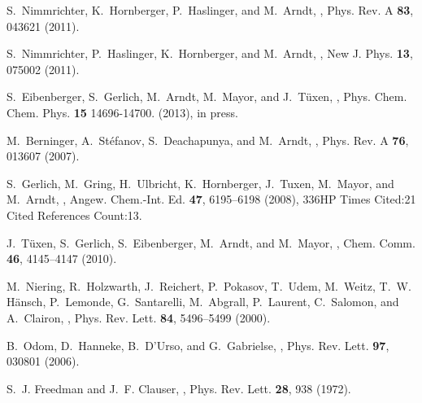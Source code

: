 \documentclass[11pt]{article}
\begin{document}
\begin{thebibliography}{100}
S.~Nimmrichter, K.~Hornberger, P.~Haslinger, and M.~Arndt,
,
\newblock Phys. Rev. A {\bf 83}, 043621 (2011).

S.~Nimmrichter, P.~Haslinger, K.~Hornberger, and M.~Arndt,
,
\newblock New J. Phys. {\bf 13}, 075002 (2011).

S.~Eibenberger, S.~Gerlich, M.~Arndt, M.~Mayor, and J.~Tüxen,
,
\newblock Phys. Chem. Chem. Phys. {\bf 15} 14696-14700. (2013),
\newblock in press.

M.~Berninger, A.~Stéfanov, S.~Deachapunya, and M.~Arndt,
,
\newblock Phys. Rev. A {\bf 76}, 013607 (2007).

S.~Gerlich, M.~Gring, H.~Ulbricht, K.~Hornberger, J.~Tuxen, M.~Mayor, and
  M.~Arndt,
,
\newblock Angew. Chem.-Int. Ed. {\bf 47}, 6195--6198 (2008),
\newblock 336HP Times Cited:21 Cited References Count:13.

J.~Tüxen, S.~Gerlich, S.~Eibenberger, M.~Arndt, and M.~Mayor,
,
\newblock Chem. Comm. {\bf 46}, 4145--4147 (2010).

M.~Niering, R.~Holzwarth, J.~Reichert, P.~Pokasov, T.~Udem, M.~Weitz, T.~W.
  H\"ansch, P.~Lemonde, G.~Santarelli, M.~Abgrall, P.~Laurent, C.~Salomon, and
  A.~Clairon,
,
\newblock Phys. Rev. Lett. {\bf 84}, 5496--5499 (2000).

B.~Odom, D.~Hanneke, B.~D'Urso, and G.~Gabrielse,
,
\newblock Phys. Rev. Lett. {\bf 97}, 030801 (2006).

S.~J. Freedman and J.~F. Clauser,
,
\newblock Phys. Rev. Lett. {\bf 28}, 938 (1972).


\end{thebibliography}
\end{document}

